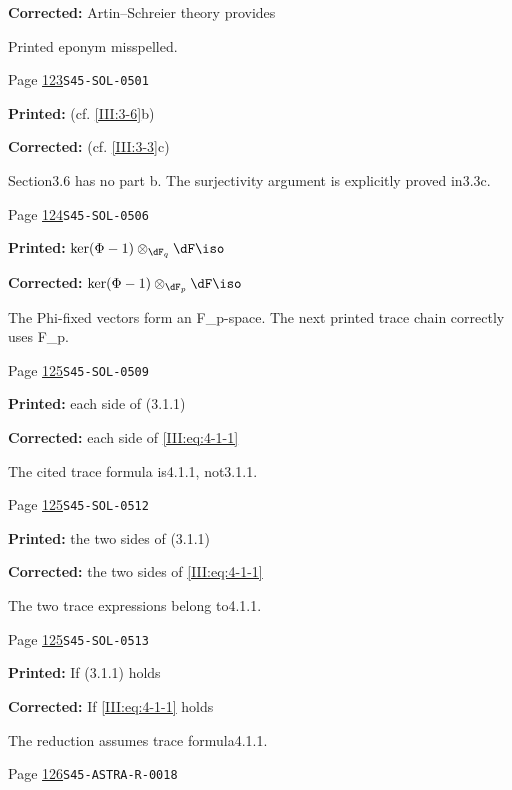 \begin{description}
\par\noindent\textbf{Corrected:} Artin--Schreier theory provides
\par\noindent Printed eponym misspelled.
\smallskip
\item[\hypertarget{apparatus:EN-0057}{57}] Page \hyperlink{printpage:en:123}{123}\quad\texttt{S45-SOL-0501}
\par\noindent\textbf{Printed:} (cf. \ref{III:3-6}b)
\par\noindent\textbf{Corrected:} (cf. \ref{III:3-3}c)
\par\noindent Section3.6 has no part b. The surjectivity argument is explicitly proved in3.3c.
\smallskip
\item[\hypertarget{apparatus:EN-0058}{58}] Page \hyperlink{printpage:en:124}{124}\quad\texttt{S45-SOL-0506}
\par\noindent\textbf{Printed:} \(\ker(\Phi-1)\otimes_{\dF_q}\dF \iso\)
\par\noindent\textbf{Corrected:} \(\ker(\Phi-1)\otimes_{\dF_p}\dF \iso\)
\par\noindent The Phi-fixed vectors form an F\_p-space. The next printed trace chain correctly uses F\_p.
\smallskip
\item[\hypertarget{apparatus:EN-0059}{59}] Page \hyperlink{printpage:en:125}{125}\quad\texttt{S45-SOL-0509}
\par\noindent\textbf{Printed:} each side of (3.1.1)
\par\noindent\textbf{Corrected:} each side of \eqref{III:eq:4-1-1}
\par\noindent The cited trace formula is4.1.1, not3.1.1.
\smallskip
\item[\hypertarget{apparatus:EN-0060}{60}] Page \hyperlink{printpage:en:125}{125}\quad\texttt{S45-SOL-0512}
\par\noindent\textbf{Printed:} the two sides of (3.1.1)
\par\noindent\textbf{Corrected:} the two sides of \eqref{III:eq:4-1-1}
\par\noindent The two trace expressions belong to4.1.1.
\smallskip
\item[\hypertarget{apparatus:EN-0061}{61}] Page \hyperlink{printpage:en:125}{125}\quad\texttt{S45-SOL-0513}
\par\noindent\textbf{Printed:} If (3.1.1) holds
\par\noindent\textbf{Corrected:} If \eqref{III:eq:4-1-1} holds
\par\noindent The reduction assumes trace formula4.1.1.
\smallskip
\item[\hypertarget{apparatus:EN-0062}{62}] Page \hyperlink{printpage:en:126}{126}\quad\texttt{S45-ASTRA-R-0018}

\end{description}
